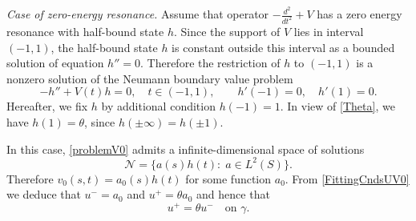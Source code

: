 \documentclass[reqno]{amsart}
\theoremstyle{plain}
\numberwithin{equation}{section}
\newcommand{\pte}{\partial_t}
\begin{document}
%
%



















\textit{Case of zero-energy resonance.}
Assume that operator $-\frac{d^2}{dt^2}+V$ has a zero energy resonance with half-bound state $h$. Since the support of $V$ lies in  interval $(-1,1)$, the half-bound state $h$ is  constant  outside this interval as a bounded solution of equation $h''=0$.
Therefore the restriction of $h$ to $(-1,1)$ is a nonzero solution of the Neumann boundary value problem
\begin{equation}\label{NeumanProblem}
     -h''+V(t)h= 0,\quad t\in(-1,1),\qquad   h'(-1)=0, \quad h'(1)=0.
\end{equation}
Hereafter, we fix $h$ by additional condition $h(-1)=1$. In view of
\eqref{Theta}, we have $h(1)=\theta$, since $h(\pm\infty)=h(\pm 1)$.




In this case, \eqref{problemV0}  admits a infinite-dimensional space of solutions
\begin{equation*}
\mathcal{N}=\big\{a(s)h(t)\colon \;a\in L^2(S)\big\}.
\end{equation*}
Therefore $v_0(s,t)=a_0(s)h(t)$ for some function $a_0$. From \eqref{FittingCndsUV0} we deduce that $u^-=a_0$ and $u^+=\theta a_0$ and hence that
\begin{equation}\label{RCond0}
     u^+=\theta u^-\quad\text {on }\gamma.
\end{equation}
\end{document}
